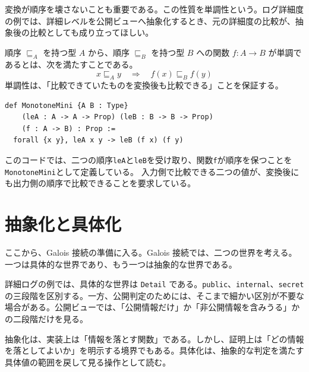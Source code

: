 変換が順序を壊さないことも重要である。この性質を単調性という。ログ詳細度の例では、詳細レベルを公開ビューへ抽象化するとき、元の詳細度の比較が、抽象後の比較としても成り立ってほしい。

\begin{definitionbox}
順序 \(\sqsubseteq_A\) を持つ型 \(A\) から、順序 \(\sqsubseteq_B\) を持つ型 \(B\) への関数 \(f : A \to B\) が単調であるとは、次を満たすことである。
\[
  x \sqsubseteq_A y \quad\Rightarrow\quad f(x) \sqsubseteq_B f(y)
\]
単調性は、「比較できていたものを変換後も比較できる」ことを保証する。
\end{definitionbox}

\begin{listing}[htbp]
\begin{verbatim}
def MonotoneMini {A B : Type}
    (leA : A -> A -> Prop) (leB : B -> B -> Prop)
    (f : A -> B) : Prop :=
  forall {x y}, leA x y -> leB (f x) (f y)
\end{verbatim}
\caption{単調性の最小定義}
\label{lst:ch16-monotone}
\end{listing}

このコードでは、二つの順序\texttt{leA}と\texttt{leB}を受け取り、関数\texttt{f}が順序を保つことを\texttt{MonotoneMini}として定義している。
入力側で比較できる二つの値が、変換後にも出力側の順序で比較できることを要求している。

\section{抽象化と具体化}

ここから、Galois 接続の準備に入る。Galois 接続では、二つの世界を考える。一つは具体的な世界であり、もう一つは抽象的な世界である。

詳細ログの例では、具体的な世界は \texttt{Detail} である。\texttt{public}、\texttt{internal}、\texttt{secret} の三段階を区別する。一方、公開判定のためには、そこまで細かい区別が不要な場合がある。公開ビューでは、「公開情報だけ」か「非公開情報を含みうる」かの二段階だけを見る。

\begin{softwarebox}
抽象化は、実装上は「情報を落とす関数」である。しかし、証明上は「どの情報を落としてよいか」を明示する境界でもある。具体化は、抽象的な判定を満たす具体値の範囲を戻して見る操作として読む。
\end{softwarebox}

